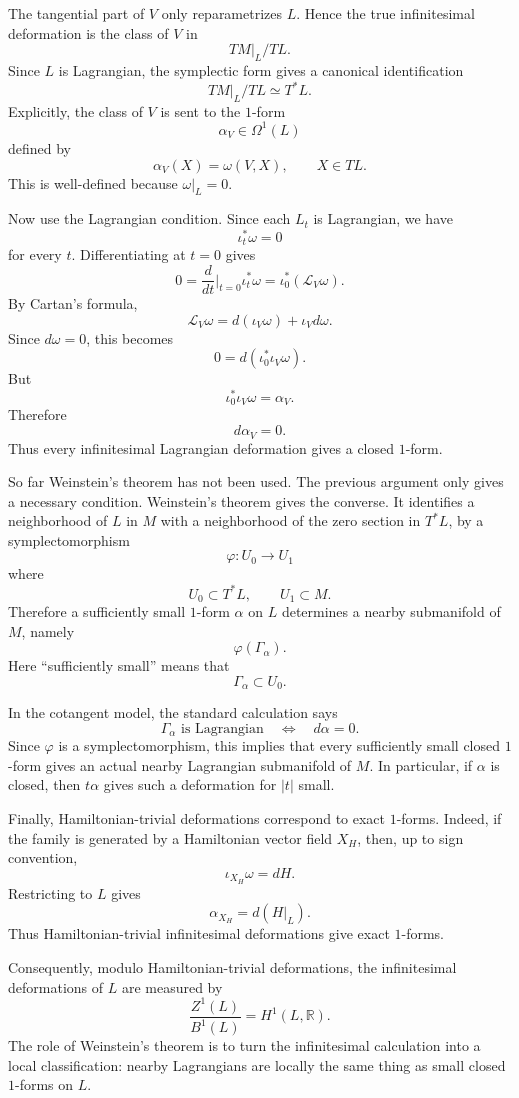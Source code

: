 \medskip\noindent
The tangential part of $V$ only
reparametrizes $L$. Hence the true
infinitesimal deformation is the class of
$V$ in
$$
TM|_L/TL.
$$
Since $L$ is Lagrangian, the symplectic
form gives a canonical identification
$$
TM|_L/TL\simeq T^*L.
$$
Explicitly, the class of $V$ is sent to
the $1$-form
$$
\alpha_V\in\Omega^1(L)
$$
defined by
$$
\alpha_V(X)=\omega(V,X),
\qquad X\in TL.
$$
This is well-defined because
$\omega|_L=0$.

\medskip\noindent
Now use the Lagrangian condition. Since
each $L_t$ is Lagrangian, we have
$$
\iota_t^*\omega=0
$$
for every $t$. Differentiating at $t=0$
gives
$$
0=
\frac{d}{dt}\bigg|_{t=0}\iota_t^*\omega
=
\iota_0^*(\mathcal L_V\omega).
$$
By Cartan's formula,
$$
\mathcal L_V\omega
=
d(\iota_V\omega)+\iota_Vd\omega.
$$
Since $d\omega=0$, this becomes
$$
0=d(\iota_0^*\iota_V\omega).
$$
But
$$
\iota_0^*\iota_V\omega=\alpha_V.
$$
Therefore
$$
d\alpha_V=0.
$$
Thus every infinitesimal Lagrangian
deformation gives a closed $1$-form.

\medskip\noindent
So far Weinstein's theorem has not been
used. The previous argument only gives a
necessary condition. Weinstein's theorem
gives the converse. It identifies a
neighborhood of $L$ in $M$ with a
neighborhood of the zero section in
$T^*L$, by a symplectomorphism
$$
\varphi:U_0\to U_1
$$
where
$$
U_0\subset T^*L,
\qquad
U_1\subset M.
$$
Therefore a sufficiently small $1$-form
$\alpha$ on $L$ determines a nearby
submanifold of $M$, namely
$$
\varphi(\Gamma_\alpha).
$$
Here ``sufficiently small'' means that
$$
\Gamma_\alpha\subset U_0.
$$

\medskip\noindent
In the cotangent model, the standard
calculation says
$$
\Gamma_\alpha\text{ is Lagrangian}
\quad\Longleftrightarrow\quad
d\alpha=0.
$$
Since $\varphi$ is a symplectomorphism,
this implies that every sufficiently small
closed $1$-form gives an actual nearby
Lagrangian submanifold of $M$. In
particular, if $\alpha$ is closed, then
$t\alpha$ gives such a deformation for
$|t|$ small.

\medskip\noindent
Finally, Hamiltonian-trivial deformations
correspond to exact $1$-forms. Indeed, if
the family is generated by a Hamiltonian
vector field $X_H$, then, up to sign
convention,
$$
\iota_{X_H}\omega=dH.
$$
Restricting to $L$ gives
$$
\alpha_{X_H}=d(H|_L).
$$
Thus Hamiltonian-trivial infinitesimal
deformations give exact $1$-forms.

\medskip\noindent
Consequently, modulo Hamiltonian-trivial
deformations, the infinitesimal
deformations of $L$ are measured by
$$
\frac{Z^1(L)}{B^1(L)}
=
H^1(L,\mathbb R).
$$
The role of Weinstein's theorem is to turn
the infinitesimal calculation into a local
classification: nearby Lagrangians are
locally the same thing as small closed
$1$-forms on $L$.

